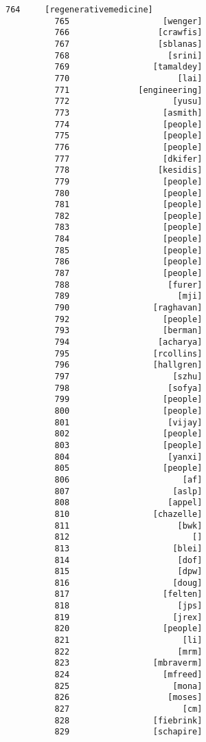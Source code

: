 \documentclass[11pt]{article}
\begin{document}
\begin{Verbatim}[commandchars=\\\{\}]
          764     [regenerativemedicine]
          765                   [wenger]
          766                  [crawfis]
          767                  [sblanas]
          768                    [srini]
          769                 [tamaldey]
          770                      [lai]
          771              [engineering]
          772                     [yusu]
          773                   [asmith]
          774                   [people]
          775                   [people]
          776                   [people]
          777                   [dkifer]
          778                  [kesidis]
          779                   [people]
          780                   [people]
          781                   [people]
          782                   [people]
          783                   [people]
          784                   [people]
          785                   [people]
          786                   [people]
          787                   [people]
          788                    [furer]
          789                      [mji]
          790                 [raghavan]
          792                   [people]
          793                   [berman]
          794                  [acharya]
          795                 [rcollins]
          796                 [hallgren]
          797                     [szhu]
          798                    [sofya]
          799                   [people]
          800                   [people]
          801                    [vijay]
          802                   [people]
          803                   [people]
          804                    [yanxi]
          805                   [people]
          806                       [af]
          807                     [aslp]
          808                    [appel]
          810                 [chazelle]
          811                      [bwk]
          812                         []
          813                     [blei]
          814                      [dof]
          815                      [dpw]
          816                     [doug]
          817                   [felten]
          818                      [jps]
          819                     [jrex]
          820                   [people]
          821                       [li]
          822                      [mrm]
          823                 [mbraverm]
          824                   [mfreed]
          825                     [mona]
          826                    [moses]
          827                       [cm]
          828                 [fiebrink]
          829                 [schapire]

\end{Verbatim}
\end{document}
